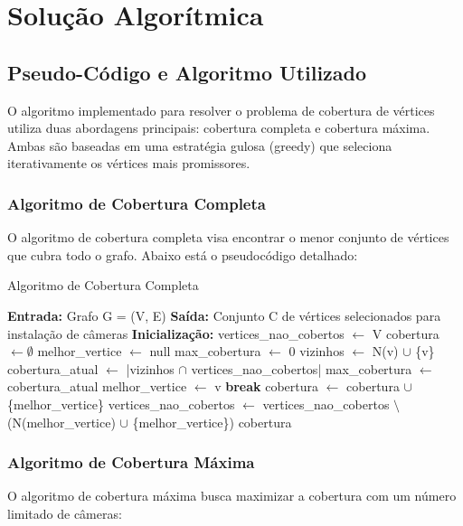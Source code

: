 \documentclass[12pt, a4paper]{report}
\begin{document}
\chapter{Solução Algorítmica}

\section{Pseudo-Código e Algoritmo Utilizado}
O algoritmo implementado para resolver o problema de cobertura de vértices utiliza duas abordagens principais: cobertura completa e cobertura máxima. Ambas são baseadas em uma estratégia gulosa (greedy) que seleciona iterativamente os vértices mais promissores.

\subsection{Algoritmo de Cobertura Completa}
O algoritmo de cobertura completa visa encontrar o menor conjunto de vértices que cubra todo o grafo. Abaixo está o pseudocódigo detalhado:

\begin{algorithm}[H]
\caption{Algoritmo de Cobertura Completa}
\begin{algorithmic}[1]
\State \textbf{Entrada:} Grafo G = (V, E)
\State \textbf{Saída:} Conjunto C de vértices selecionados para instalação de câmeras
\Statex
\State \textbf{Inicialização:}
\State vertices\_nao\_cobertos $\gets$ V
\State cobertura $\gets \emptyset$
\Statex
{}
    \State melhor\_vertice $\gets$ null
    \State max\_cobertura $\gets$ 0
            \State vizinhos $\gets$ N(v) $\cup$ \{v\} 
            \State cobertura\_atual $\gets$ |vizinhos $\cap$ vertices\_nao\_cobertos|
                \State max\_cobertura $\gets$ cobertura\_atual
                \State melhor\_vertice $\gets$ v
            \EndIf
        \EndIf
    \EndFor
        \State \textbf{break}
    \EndIf
    \State cobertura $\gets$ cobertura $\cup$ \{melhor\_vertice\}
    \State vertices\_nao\_cobertos $\gets$ vertices\_nao\_cobertos $\setminus$ (N(melhor\_vertice) $\cup$ \{melhor\_vertice\})
\EndWhile
\State \Return cobertura
\end{algorithmic}
\end{algorithm}

\subsection{Algoritmo de Cobertura Máxima}
O algoritmo de cobertura máxima busca maximizar a cobertura com um número limitado de câmeras:
\end{document}
